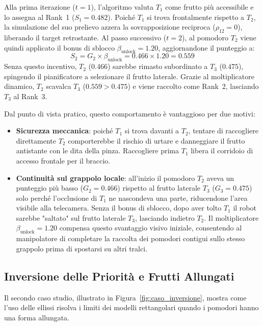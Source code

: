 Alla prima iterazione ($t = 1$), l'algoritmo valuta $T_1$ come frutto più 
accessibile e lo assegna al Rank~1 ($S_1 = 0.482$). Poiché $T_1$ si trova 
frontalmente rispetto a $T_2$, la simulazione del suo prelievo azzera la 
sovrapposizione reciproca ($\rho_{12} = 0$), liberando il target retrostante. 
Al passo successivo ($t = 2$), al pomodoro $T_2$ viene quindi applicato il 
bonus di sblocco $\beta_{\text{unlock}} = 1.20$, aggiornandone il punteggio a:
\begin{equation}
    S_2 = G_2 \times \beta_{\text{unlock}} = 0.466 \times 1.20 = 0.559
\end{equation}
Senza questo incentivo, $T_2$ ($0.466$) sarebbe rimasto subordinato a $T_3$ 
($0.475$), spingendo il pianificatore a selezionare il frutto laterale. Grazie 
al moltiplicatore dinamico, $T_2$ scavalca $T_3$ ($0.559 > 0.475$) e viene 
raccolto come Rank~2, lasciando $T_3$ al Rank~3.

Dal punto di vista pratico, questo comportamento è vantaggioso per due motivi:
\begin{itemize}
    \item \textbf{Sicurezza meccanica}: poiché $T_1$ si trova davanti a $T_2$, 
    tentare di raccogliere direttamente $T_2$ comporterebbe il rischio di urtare 
    e danneggiare il frutto antistante con le dita della pinza. Raccogliere 
    prima $T_1$ libera il corridoio di accesso frontale per il braccio.
    \item \textbf{Continuità sul grappolo locale}: all'inizio il pomodoro $T_2$ 
    aveva un punteggio più basso ($G_2 = 0.466$) rispetto al frutto laterale $T_3$ 
    ($G_3 = 0.475$) solo perché l'occlusione di $T_1$ ne nascondeva una parte, 
    riducendone l'area visibile alla telecamera. Senza il bonus di sblocco, dopo aver 
    tolto $T_1$ il robot sarebbe "saltato" sul frutto laterale $T_3$, lasciando 
    indietro $T_2$. Il moltiplicatore $\beta_{\text{unlock}} = 1.20$ compensa 
    questo svantaggio visivo iniziale, consentendo al manipolatore di completare 
    la raccolta dei pomodori contigui sullo stesso grappolo prima di spostarsi su 
    altri tralci.
\end{itemize}


\subsection{Inversione delle Priorità e Frutti Allungati}
\label{subsec:caso_studio_inversione}

Il secondo caso studio, illustrato in Figura~\ref{fig:caso_inversione}, 
mostra come l'uso delle ellissi risolva i limiti dei modelli rettangolari 
quando i pomodori hanno una forma allungata.

